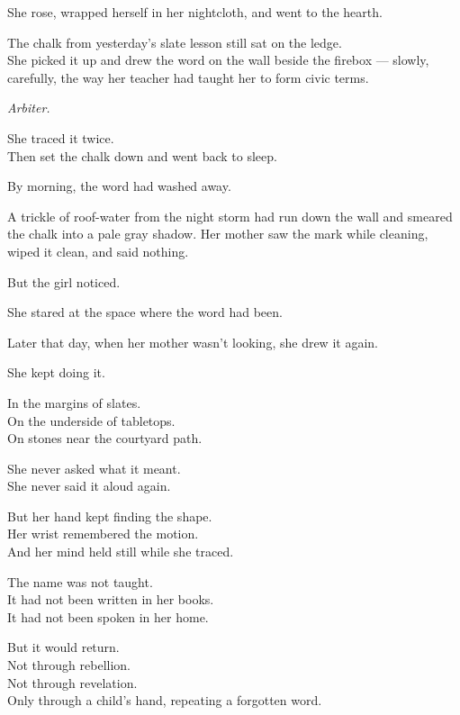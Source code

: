 \documentclass[9pt]{article}
\begin{document}
She rose, wrapped herself in her nightcloth, and went to the hearth.

The chalk from yesterday’s slate lesson still sat on the ledge.\\
She picked it up and drew the word on the wall beside the firebox --- slowly, carefully, the way her teacher had taught her to form civic terms.

\begin{center}
\textit{Arbiter.}
\end{center}

She traced it twice.\\
Then set the chalk down and went back to sleep.

\vspace{1em}

By morning, the word had washed away.

A trickle of roof-water from the night storm had run down the wall and smeared the chalk into a pale gray shadow. Her mother saw the mark while cleaning, wiped it clean, and said nothing.

But the girl noticed.

She stared at the space where the word had been.

Later that day, when her mother wasn’t looking, she drew it again.

\vspace{1em}

She kept doing it.

In the margins of slates.\\
On the underside of tabletops.\\
On stones near the courtyard path.

She never asked what it meant.\\
She never said it aloud again.

But her hand kept finding the shape.\\
Her wrist remembered the motion.\\
And her mind held still while she traced.

\vspace{1em}

The name was not taught.\\
It had not been written in her books.\\
It had not been spoken in her home.

But it would return.\\
Not through rebellion.\\
Not through revelation.\\
Only through a child’s hand, repeating a forgotten word.
\end{document}
